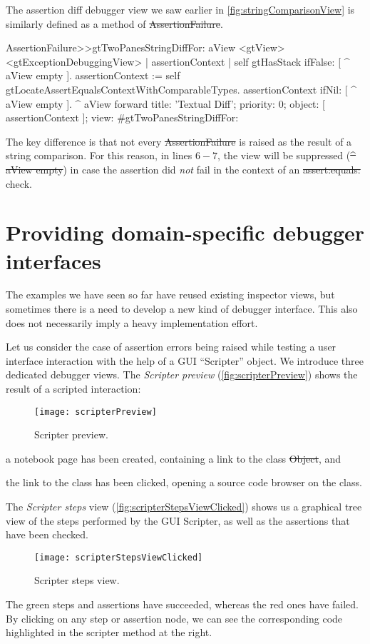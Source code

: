 \documentclass[sigplan,anonymous,review,10pt]{acmart}
\begin{document}
The assertion diff debugger view we saw earlier in \autoref{fig:stringComparisonView} is similarly defined as a method of \st{AssertionFailure}.
\begin{code}
AssertionFailure>>gtTwoPanesStringDiffFor: aView
	<gtView>
	<gtExceptionDebuggingView>
	| assertionContext |
	self gtHasStack ifFalse: [ ^ aView empty ].
	assertionContext := self gtLocateAssertEqualsContextWithComparableTypes.
	assertionContext ifNil: [ ^ aView empty ].
	^ aView forward
		title: 'Textual Diff';
		priority: 0;
		object: [ assertionContext ];
		view: #gtTwoPanesStringDiffFor:
\end{code}
The key difference is that not every \st{AssertionFailure} is raised as the result of a string comparison.
For this reason, in lines $6-7$, the view will be suppressed (\st{^ aView empty}) in case the assertion did \emph{not} fail in the context of an \st{assert:equals:} check.

\section{Providing domain-specific debugger interfaces}\label{sec:interactions}

The examples we have seen so far have reused existing inspector views, but sometimes there is a need to develop a new kind of debugger interface.
This also does not necessarily imply a heavy implementation effort.

Let us consider the case of assertion errors being raised while testing a user interface interaction with the help of a GUI ``Scripter'' object.
We introduce three dedicated debugger views.
The \emph{Scripter preview} (\autoref{fig:scripterPreview}) shows the result of a scripted interaction:
\begin{figure}[h]
  \texttt{[image: scripterPreview]}
  \caption{Scripter preview.}
  \label{fig:scripterPreview}
\end{figure}
\begin{inparaenum}[(i)]
	\item a notebook page has been created, containing a link to the class \st{Object}, and
	\item the link to the class has been clicked, opening a source code browser on the class.
\end{inparaenum}

The \emph{Scripter steps} view (\autoref{fig:scripterStepsViewClicked}) shows us a graphical tree view of the steps performed by the GUI Scripter, as well as the assertions that have been checked.
\begin{figure}[h]
  \texttt{[image: scripterStepsViewClicked]}
  \caption{Scripter steps view.}
  \label{fig:scripterStepsViewClicked}
\end{figure}
The green steps and assertions have succeeded, whereas the red ones have failed.
By clicking on any step or assertion node, we can see the corresponding code highlighted in the scripter method at the right.
\end{document}
